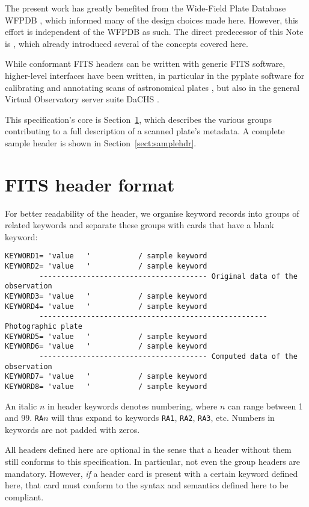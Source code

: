 \documentclass[11pt]{ivoa}
\newcommand\cardname[1]{\texttt{\color{keyword}#1}}
\begin{document}
The present work has greatly benefited from the Wide-Field Plate
Database WFPDB \citep{1995LNP...454..412T}, which informed many of the
design choices made here.  However, this effort is independent of the
WFPDB as such.  The direct predecessor of this Note is \citet{paper1},
which already introduced several of the concepts covered here.

While conformant FITS headers can be written with generic FITS software,
higher-level interfaces have been written, in particular in the pyplate
software for calibrating and annotating scans of astronomical plates
\citep{soft:pyplates}, but also in the general Virtual Observatory
server suite DaCHS \citep{2014A+C.....7...27D}.

This specification's core is Section~\ref{sect:format}, which describes
the various groups contributing to a full description of a scanned
plate's metadata.  A complete
sample header is shown in Section~\ref{sect:samplehdr}.

\section{FITS header format}
\label{sect:format}

For better readability of the header, we organise keyword records
into groups of related keywords and separate these groups with
cards that have a blank keyword:

\begin{lstlisting}
KEYWORD1= 'value   '           / sample keyword
KEYWORD2= 'value   '           / sample keyword
        --------------------------------------- Original data of the observation
KEYWORD3= 'value   '           / sample keyword
KEYWORD4= 'value   '           / sample keyword
        ----------------------------------------------------- Photographic plate
KEYWORD5= 'value   '           / sample keyword
KEYWORD6= 'value   '           / sample keyword
        --------------------------------------- Computed data of the observation
KEYWORD7= 'value   '           / sample keyword
KEYWORD8= 'value   '           / sample keyword
\end{lstlisting}

An italic $n$ in header keywords denotes numbering, where $n$
can range between 1 and 99.  \cardname{RA$n$} will thus expand to
keywords \cardname{RA1}, \cardname{RA2}, \cardname{RA3}, etc. Numbers in
keywords are not padded with zeros.

All headers defined here are optional in the sense that a header without
them still conforms to this specification.  In particular, not even the
group headers are mandatory.  However, \emph{if} a header card is present
with a certain keyword defined here, that card must conform to the
syntax and semantics defined here to be compliant.
\end{document}
